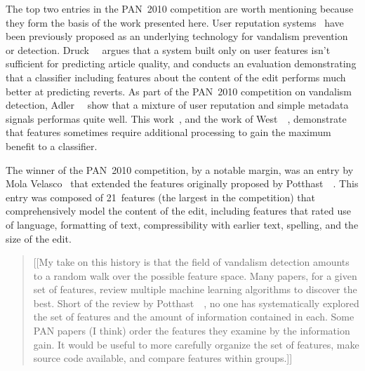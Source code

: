 The top two entries in the PAN~2010 competition are worth mentioning
because they form the basis of the work presented here.
User reputation systems~\cite{WikiTrust06,WikiMTWtrust06,Adler2007}
have been previously proposed as an underlying technology for
vandalism prevention or detection.
Druck~\etal~\cite{Druck2008} argues that a system built only on user
features isn't sufficient for predicting article quality, and conducts
an evaluation demonstrating that a classifier including features about
the content of the edit performs much better at predicting reverts.
As part of the PAN~2010 competition on vandalism detection,
Adler~\etal~\cite{Adler2010} show that a mixture of user reputation
and simple metadata signals performas quite well.
This work~\cite{Adler2010}, and the work of
West~\etal~\cite{West2010}, demonstrate that features sometimes
require additional processing to gain the maximum benefit to a classifier.

The winner of the PAN~2010 competition, by a notable margin, was
an entry by Mola Velasco~\cite{Mola2010} that extended the features
originally proposed by Potthast~\etal~\cite{Potthast2008}.
This entry was composed of 21~features (the largest in the
competition) that comprehensively model the content of the edit,
including features that rated use of language, formatting of text,
compressibility with earlier text, spelling,
and the size of the edit.

\begin{quote}
[[My take on this history is that the field of vandalism detection
amounts to a random walk over the possible feature space.
Many papers, for a given set of features, review multiple machine
learning algorithms to discover the best.
Short of the review by Potthast~\etal~\cite{Potthast2010b}, no one
has systematically explored the set of features and the amount of
information contained in each.
Some PAN papers (I think) order the features they examine by the
information gain.
It would be useful to more carefully organize the set of features,
make source code available, and compare features within groups.]]
\end{quote}

